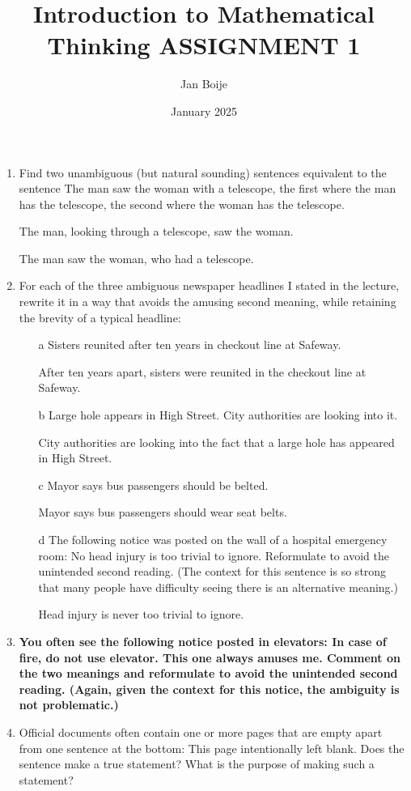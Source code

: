 \documentclass[12pt, letterpaper]{article}
\title{Introduction to Mathematical Thinking ASSIGNMENT 1}
\author{Jan Boije}
\date{January 2025}
\begin{document}
\maketitle

\begin{enumerate}
 \item Find two unambiguous (but natural sounding) sentences equivalent to the sentence The man saw
the woman with a telescope, the first where the man has the telescope, the second where the woman
has the telescope.

The man, looking through a telescope, saw the woman.

The man saw the woman, who had a telescope. 
 \item For each of the three ambiguous newspaper headlines I stated in the lecture, rewrite it in a way
that avoids the amusing second meaning, while retaining the brevity of a typical headline:
\begin{enumerate}
\item[a] Sisters reunited after ten years in checkout line at Safeway.

After ten years apart, sisters were reunited in the checkout line at Safeway.
\item[b] Large hole appears in High Street. City authorities are looking into it.

City authorities are looking into the fact that a large hole has appeared in High Street.

\item[c] Mayor says bus passengers should be belted.

Mayor says bus passengers should wear seat belts.
 \item[d] The following notice was posted on the wall of a hospital emergency room:
No head injury is too trivial to ignore.
Reformulate to avoid the unintended second reading. (The context for this sentence is so strong
that many people have difficulty seeing there is an alternative meaning.)

Head injury is never too trivial to ignore.
\end{enumerate}
 \item \textbf{You often see the following notice posted in elevators:
In case of fire, do not use elevator.
This one always amuses me. Comment on the two meanings and reformulate to avoid the unintended
second reading. (Again, given the context for this notice, the ambiguity is not problematic.)}
 \item Official documents often contain one or more pages that are empty apart from one sentence at the
bottom:
This page intentionally left blank.
Does the sentence make a true statement? What is the purpose of making such a statement?


\end{enumerate}
\end{document}
